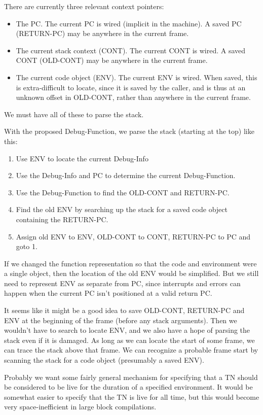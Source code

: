 There are currently three relevant context pointers:
\begin{itemize}
   \item The PC.  The current PC is wired (implicit in the machine).  A saved
     PC (RETURN-PC) may be anywhere in the current frame.
   \item The current stack context (CONT).  The current CONT is wired.
     A saved CONT (OLD-CONT) may be anywhere in the current frame.
   \item The current code object (ENV).  The current ENV is wired.
     When saved, this is extra-difficult to locate, since it is saved
     by the caller, and is thus at an unknown offset in OLD-CONT,
     rather than anywhere in the current frame.
\end{itemize}

We must have all of these to parse the stack.

With the proposed Debug-Function, we parse the stack (starting at the top) like
this:
\begin{enumerate}
\item Use ENV to locate the current Debug-Info
\item Use the Debug-Info and PC to determine the current Debug-Function.
\item Use the Debug-Function to find the OLD-CONT and RETURN-PC.
\item Find the old ENV by searching up the stack for a saved code object
    containing the RETURN-PC.
\item Assign old ENV to ENV, OLD-CONT to CONT, RETURN-PC to PC and goto 1.
\end{enumerate}

If we changed the function representation so that the code and environment were
a single object, then the location of the old ENV would be simplified.  But we
still need to represent ENV as separate from PC, since interrupts and errors
can happen when the current PC isn't positioned at a valid return PC.

It seems like it might be a good idea to save OLD-CONT, RETURN-PC and ENV at
the beginning of the frame (before any stack arguments).  Then we wouldn't have
to search to locate ENV, and we also have a hope of parsing the stack even if
it is damaged.  As long as we can locate the start of some frame, we can trace
the stack above that frame.  We can recognize a probable frame start by
scanning the stack for a code object (presumably a saved ENV).

Probably we want some fairly general
mechanism for specifying that a TN should be considered to be live for the
duration of a specified environment.  It would be somewhat easier to specify
that the TN is live for all time, but this would become very space-inefficient
in large block compilations.

